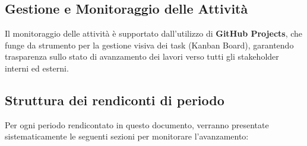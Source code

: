 \documentclass[a4paper, 11pt, oneside]{scrartcl} %
\begin{document}
\subsection{Gestione e Monitoraggio delle Attività}
Il monitoraggio delle attività è supportato dall'utilizzo di \textbf{GitHub Projects}, che funge da strumento per la gestione visiva dei task (Kanban Board), garantendo trasparenza sullo stato di avanzamento dei lavori verso tutti gli stakeholder interni ed esterni.

\subsection{Struttura dei rendiconti di periodo}
Per ogni periodo rendicontato in questo documento, verranno presentate sistematicamente le seguenti sezioni per monitorare l'avanzamento:
\end{document}
